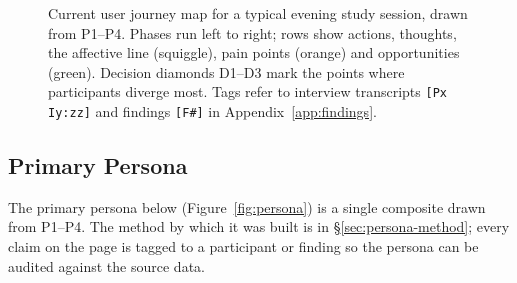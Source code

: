 \documentclass[a4paper,11pt]{article}
\begin{document}
\begin{landscape}
\begin{figure}[!ht]
{%
}
\caption{Current user journey map for a typical evening study session,
drawn from P1--P4. Phases run left to right; rows show actions,
thoughts, the affective line (squiggle), pain points (orange) and
opportunities (green). Decision diamonds D1--D3 mark the points where
participants diverge most. Tags refer to interview transcripts
\texttt{[Px Iy:zz]} and findings \texttt{[F\#]} in
Appendix~\ref{app:findings}.}\label{fig:journey}
\end{figure}
\end{landscape}

\clearpage
\subsection{Primary Persona}\label{sec:persona}

The primary persona below (Figure~\ref{fig:persona}) is a single
composite drawn from P1--P4. The method by which it was built
is in \S\ref{sec:persona-method}; every claim on the page is tagged
to a participant or finding so the persona can be audited against
the source data.
\end{document}
